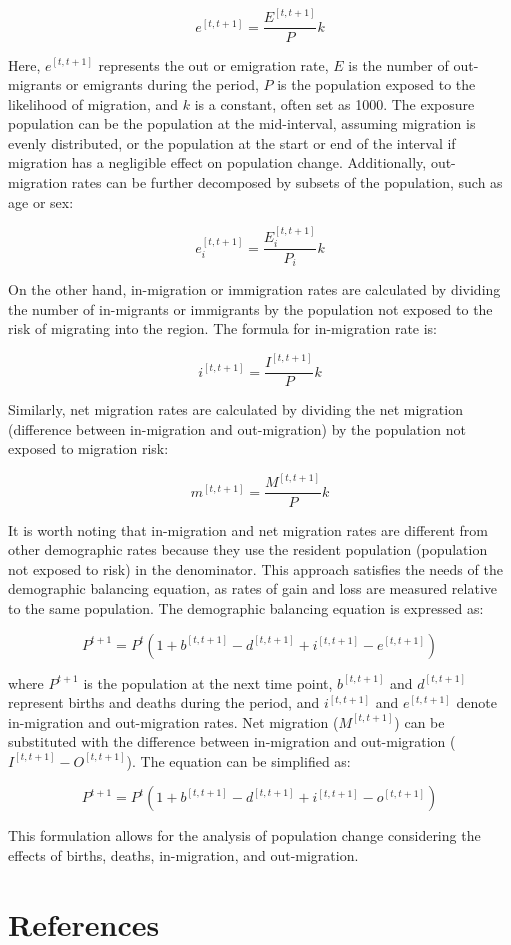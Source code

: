 \documentclass[
]{book}
\begin{document}
\[ e^{[t, t+1]} = \frac{E^{[t, t+1]}}{P}k \]

Here, \(e^{[t, t+1]}\) represents the out or emigration rate, \(E\) is the number of out-migrants or emigrants during the period, \(P\) is the population exposed to the likelihood of migration, and \(k\) is a constant, often set as 1000. The exposure population can be the population at the mid-interval, assuming migration is evenly distributed, or the population at the start or end of the interval if migration has a negligible effect on population change. Additionally, out-migration rates can be further decomposed by subsets of the population, such as age or sex:

\[ e^{[t, t+1]}_i = \frac{E^{[t, t+1]}_i}{P_i}k \]

On the other hand, in-migration or immigration rates are calculated by dividing the number of in-migrants or immigrants by the population not exposed to the risk of migrating into the region. The formula for in-migration rate is:

\[ i^{[t, t+1]} = \frac{I^{[t, t+1]}}{P}k \]

Similarly, net migration rates are calculated by dividing the net migration (difference between in-migration and out-migration) by the population not exposed to migration risk:

\[ m^{[t, t+1]} = \frac{M^{[t, t+1]}}{P}k \]

It is worth noting that in-migration and net migration rates are different from other demographic rates because they use the resident population (population not exposed to risk) in the denominator. This approach satisfies the needs of the demographic balancing equation, as rates of gain and loss are measured relative to the same population. The demographic balancing equation is expressed as:

\[ P^{t+1} = P^t \left(1 + b^{[t, t+1]} - d^{[t, t+1]} + i^{[t, t+1]} - e^{[t, t+1]} \right) \]

where \(P^{t+1}\) is the population at the next time point, \(b^{[t, t+1]}\) and \(d^{[t, t+1]}\) represent births and deaths during the period, and \(i^{[t, t+1]}\) and \(e^{[t, t+1]}\) denote in-migration and out-migration rates. Net migration (\(M^{[t, t+1]}\)) can be substituted with the difference between in-migration and out-migration (\(I^{[t, t+1]} - O^{[t, t+1]}\)). The equation can be simplified as:

\[ P^{t+1} = P^t \left(1 + b^{[t, t+1]} - d^{[t, t+1]} + i^{[t, t+1]} - o^{[t, t+1]} \right) \]

This formulation allows for the analysis of population change considering the effects of births, deaths, in-migration, and out-migration.

\hypertarget{references}{%
\section{References}\label{references}}

  
\end{document}
